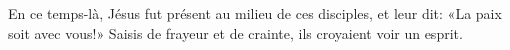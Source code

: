 En ce temps-là, Jésus fut présent au milieu de ces disciples,
	et leur dit: «La paix soit avec vous!»
Saisis de frayeur et de crainte, ils croyaient voir un esprit.

